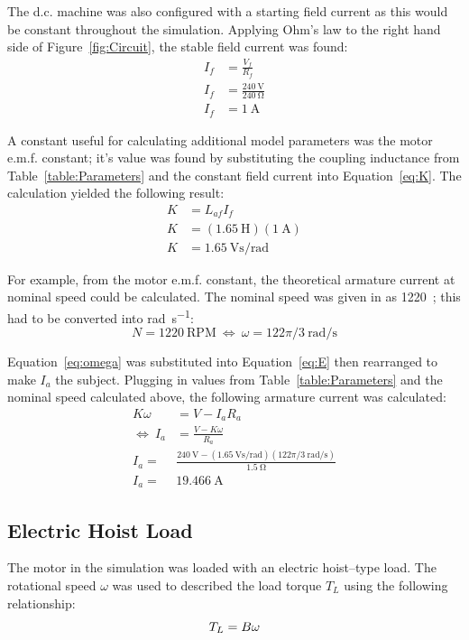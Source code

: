 \documentclass[a4paper,11pt,twocolumn]{article}
\newcommand{\V}{\si{\volt}\xspace}
\newcommand{\A}{\si{\ampere}\xspace}
\newcommand{\Ohm}{\si{\ohm}\xspace}
\renewcommand{\H}{\si{\henry}\xspace}
\newcommand{\rps}{\si{\radian\per\second}\xspace}
\newcommand{\Vspr}{\si{\volt\second\per\radian}\xspace}
\newcommand{\RPM}{\text{RPM}\xspace}
\newcommand{\DC}{d.c.\xspace}
\newcommand{\EMF}{e.m.f.\xspace}
\begin{document}
The \DC machine was also configured with a starting field current as this would 
be constant throughout the simulation. Applying Ohm's law to the right hand 
side of Figure~\ref{fig:Circuit}, the stable field current was found:
\begin{align*}
    I_f &= \frac{V_f}{R_f} \\
    I_f &= \frac{240~\V}{240~\Ohm} \\
    I_f &= 1~\A
\end{align*}

A constant useful for calculating additional model parameters was the motor 
\EMF constant; it's value was found by substituting the coupling inductance 
from Table~\ref{table:Parameters} and the constant field current into 
Equation~\ref{eq:K}. The calculation yielded the following result:
\begin{align*}
    K &= L_{af} I_f \\
    K &= (1.65~\H) (1~\A) \\
    K &= 1.65~\Vspr
\end{align*}

For example, from the motor \EMF constant, the theoretical armature current at 
nominal speed could be calculated. The nominal speed was given in 
\cite{brigham2016coursework} as 1220~\RPM; this had to be converted into \rps:
\begin{equation*}
    N = 1220~\RPM~\Leftrightarrow~\omega = 122\pi/3~\rps
\end{equation*}

Equation~\ref{eq:omega} was substituted into Equation~\ref{eq:E} then 
rearranged to make $I_a$ the subject. Plugging in values from 
Table~\ref{table:Parameters} and the nominal speed calculated above, the 
following armature current was calculated:
\begin{align*}
    K \omega &= V - I_a R_a \\
    \Leftrightarrow~ I_a &= \frac{V - K \omega}{R_a} \\
    I_a =& \frac{240~\V - (1.65~\Vspr)(122\pi/3~\rps)}{1.5~\Ohm} \\
    I_a =& 19.466~\A
\end{align*}

\subsection{Electric Hoist Load}

The motor in the simulation was loaded with an electric hoist--type load. The 
rotational speed $\omega$ was used to described the load torque $T_L$ 
using the following relationship:
\begin{equation} \label{eq:B}
    T_L = B\omega \\
\end{equation}
\end{document}
